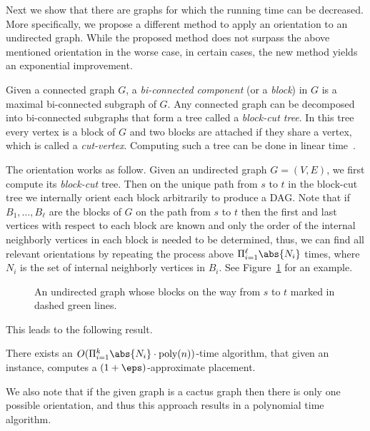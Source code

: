 Next we show that there are graphs for which the running time can be
decreased.  More specifically, we propose a different method to apply
an orientation to an undirected graph.  While the proposed method does
not surpass the above mentioned orientation in the worse case, in
certain cases, the new method yields an exponential improvement.

Given a connected graph $G$, a \emph{bi-connected component} (or a
\emph{block}) in $G$ is a maximal bi-connected subgraph of $G$.  Any
connected graph can be decomposed into bi-connected subgraphs that
form a tree called a \emph{block-cut tree}.  In this tree every vertex
is a block of $G$ and two blocks are attached if they share a vertex,
which is called a \emph{cut-vertex}.
%
Computing such a tree can be done in linear
time~\cite{HopcroftTarjan73}.

The orientation works as follow.  Given an undirected graph $G =
(V,E)$, we first compute its \emph{block-cut} tree.  Then on the
unique path from $s$ to $t$ in the block-cut tree we internally orient
each block arbitrarily to produce a DAG.
%
Note that if $B_1, \ldots, B_\ell$ are the blocks of $G$ on the path
from $s$ to $t$ then the first and last vertices with respect to each
block are known and only the order of the internal neighborly vertices
in each block is needed to be determined, thus, we can find all
relevant orientations by repeating the process above $\Pi_{i = 1}^\ell
\abs{N_i}$ times, where $N_i$ is the set of internal neighborly
vertices in $B_i$.  See Figure~\ref{fig:or2} for an example.

\begin{figure}[t]
\begin{center}
\end{center}
\caption[\scp{} - Block graph example]{An undirected graph whose blocks on the way from $s$ to $t$
  marked in dashed green lines.
\label{fig:or2}
}
\end{figure}   

This leads to the following result.

\begin{theorem}
There exists an $O(\Pi_{i = 1}^k \abs{N_i} \cdot \text{\rm
  poly}(n))$-time algorithm, that given an \scp instance, computes a
$(1+\eps)$-approximate placement.
\end{theorem}

We also note that if the given graph is a cactus graph then there is
only one possible orientation, and thus this approach results in a
polynomial time algorithm.

